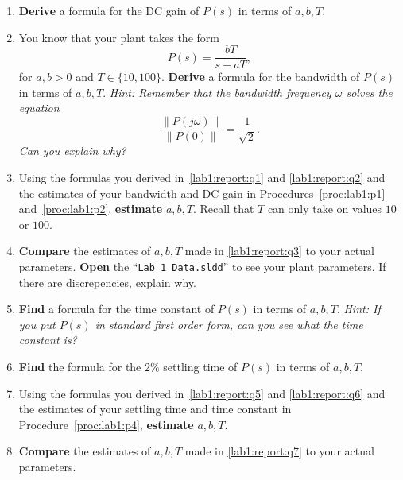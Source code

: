 \begin{deliverable}[label={lab1:report}]
  \begin{enumerate}[label={(\arabic*)}]
    \item{
      \textbf{Derive} a formula for the DC gain of \(P(s)\) in terms of
      \(a, b, T.\)
      \label{lab1:report:q1}
    }
    \item{
      You know that your plant takes the form
      \[
        P(s) = \frac{b T}{s + a T},
      \]
      for \(a, b > 0\) and \(T \in \{10, 100\}.\) \textbf{Derive} a
      formula for the bandwidth of \(P(s)\) in terms of \(a, b, T.\)
      \emph{Hint: Remember that the bandwidth frequency \(\omega\) solves
      the equation}
      \[
        \frac{\left\|P(j \omega)\right\|}{\left\|P(0)\right\|}
        =
        \frac{1}{\sqrt{2}}.
      \]
      \emph{Can you explain why?}
      \label{lab1:report:q2}
    }
    \item{
      Using the formulas you derived in~\ref{lab1:report:q1} and
      \ref{lab1:report:q2} and the estimates of your bandwidth and DC gain
      in Procedures~\ref{proc:lab1:p1} and~\ref{proc:lab1:p2},
      \textbf{estimate} \(a, b, T.\) Recall that \(T\) can only take on
      values \(10\) or \(100.\)
      \label{lab1:report:q3}
    }
    \item{
      \textbf{Compare} the estimates of \(a, b, T\) made in
      \ref{lab1:report:q3} to your actual parameters.
      \textbf{Open} the ``\texttt{Lab\_1\_Data.sldd}'' to see your plant
      parameters. If there are discrepencies, explain why.
      \label{lab1:report:q4}
    }
    \item{
      \textbf{Find} a formula for the time constant of \(P(s)\) in terms of
      \(a, b, T.\) \emph{Hint: If you put \(P(s)\) in standard first order
      form, can you see what the time constant is?}
      \label{lab1:report:q5}
    }
    \item{
      \textbf{Find} the formula for the \(2\%\) settling time of \(P(s)\) in terms of \(a, b, T.\)
      \label{lab1:report:q6}
    }
    \item{
      Using the formulas you derived in~\ref{lab1:report:q5} and
      \ref{lab1:report:q6} and the estimates of your settling time and
      time constant in Procedure~\ref{proc:lab1:p4},
      \textbf{estimate} \(a, b, T.\)
      \label{lab1:report:q7}
    }
    \item{
      \textbf{Compare} the estimates of \(a, b, T\) made in
      \ref{lab1:report:q7} to your actual parameters.
      \label{lab1:report:q8}
}
\end{enumerate}
\end{deliverable}
